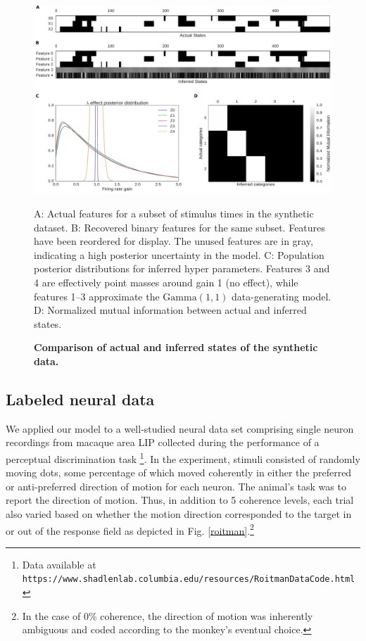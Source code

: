 \documentclass[12pt,a4paper]{article}
\begin{document}
\begin{figure}[!ht]
    \includegraphics[width=\linewidth]{figures/synthetic}
	\caption{\bf Comparison of actual and inferred states of the synthetic data.} A: Actual features for a subset of stimulus times in the synthetic dataset. B: Recovered binary features for the same subset. Features have been reordered for display. The unused features are in gray, indicating a high posterior uncertainty in the model. C: Population posterior distributions for inferred hyper parameters. Features 3 and 4 are effectively point masses around gain 1 (no effect), while features 1--3 approximate the $\text{Gamma}(1, 1)$ data-generating model. D: Normalized mutual information between actual and inferred states.
	\label{synthetic}
\end{figure}


\subsection*{Labeled neural data}
We applied our model to a well-studied neural data set comprising single neuron recordings from macaque area LIP collected during the performance of a perceptual discrimination task \cite{roitman2002response}\footnote{Data available at \texttt{https://www.shadlenlab.columbia.edu/resources/RoitmanDataCode.html}}. In the experiment, stimuli consisted of randomly moving dots, some percentage of which moved coherently in either the preferred or anti-preferred direction of motion for each neuron. The animal's task was to report the direction of motion. Thus, in addition to 5 coherence levels, each trial also varied based on whether the motion direction corresponded to the target in or out of the response field as depicted in Fig. \ref{roitman}.\footnote{In the case of 0\% coherence, the direction of motion was inherently ambiguous and coded according to the monkey's eventual choice.}
\end{document}
